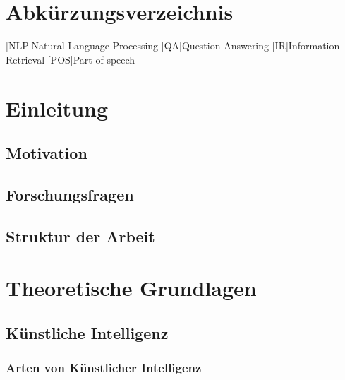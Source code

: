 \documentclass[
        ngerman,
        paper=a4,
        numbers=noendperiod,
]{scrreprt}
\begin{document}
\chapter*{Abkürzungsverzeichnis}
\begin{acronym}

[NLP]{Natural Language Processing}
[QA]{Question Answering}
[IR]{Information Retrieval}
[POS]{Part-of-speech}

\end{acronym}
\clearpage 
{} 
\listofxequations
\clearpage
{} 
\lstlistoflistings
\clearpage
\setcounter{page}{1}











\chapter{Einleitung}
\section{Motivation}
\section{Forschungsfragen}
\section{Struktur der Arbeit}




\chapter{Theoretische Grundlagen}
\section{Künstliche Intelligenz}
\subsection{Arten von Künstlicher Intelligenz}
\end{document}
